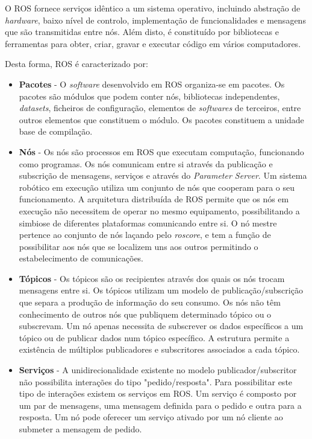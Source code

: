 O ROS fornece serviços idêntico a um sistema operativo, incluindo abstração de \textit{hardware}, baixo nível de controlo, implementação de funcionalidades e mensagens que são transmitidas entre nós. Além disto, é constituído por bibliotecas e ferramentas para obter, criar, gravar e executar código em vários computadores. 

Desta forma, ROS é caracterizado por:

\begin{itemize}
	\item \textbf{Pacotes} - O \textit{software} desenvolvido em ROS organiza-se em pacotes. Os pacotes são módulos que podem conter nós, bibliotecas independentes, \textit{datasets}, ficheiros de configuração, elementos de \textit{softwares} de terceiros, entre outros elementos que constituem o módulo. Os pacotes constituem a unidade base de compilação.
	\item \textbf{Nós} - Os nós são processos em ROS que executam computação, funcionando como programas. Os nós comunicam entre si através da publicação e subscrição de mensagens, serviços e através do \textit{Parameter Server}. Um sistema robótico em execução utiliza um conjunto de nós que cooperam para o seu funcionamento. A arquitetura distribuída de ROS permite que os nós em execução não necessitem de operar no mesmo equipamento, possibilitando a simbiose de diferentes plataformas comunicando entre si. O nó mestre pertence ao conjunto de nós laçando pelo \textit{roscore}, e tem a função de possibilitar aos nós que se localizem uns aos outros permitindo o estabelecimento de comunicações. 
	\item \textbf{Tópicos} - Os tópicos são os recipientes através dos quais os nós trocam mensagens entre si. Os tópicos utilizam um modelo de publicação/subscrição que separa a produção de informação do seu consumo. Os nós não têm conhecimento de outros nós que publiquem determinado tópico ou o subscrevam. Um nó apenas necessita de subscrever os dados específicos a um tópico ou de publicar dados num tópico específico. A estrutura permite a existência de múltiplos publicadores e subscritores associados a cada tópico.
	\item \textbf{Serviços} - A unidirecionalidade existente no modelo publicador/subscritor não possibilita interações do tipo "pedido/resposta". Para possibilitar este tipo de interações existem os serviços em ROS. Um serviço é composto por um par de mensagens, uma mensagem definida para o pedido e outra para a resposta. Um nó pode oferecer um serviço ativado por um nó cliente ao submeter a mensagem de pedido.
	
\end{itemize}

